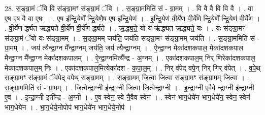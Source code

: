 \documentclass[17pt]{extarticle}
\begin{document}
28. स॒ङ्ग्रा॒मं ॅवि वि स॑ङ्ग्रा॒मꣳ स॑ङ्ग्रा॒मं ॅवि । . स॒ङ्ग्रा॒ममिति॑ सं - ग्रा॒मम् । . वि वै वै वि वि वै । . वा ए॒ष ए॒ष वै वा ए॒षः । . ए॒ष इ॑न्द्रि॒येणे᳚ न्द्रि॒येणै॒ष ए॒ष इ॑न्द्रि॒येण॑ । . इ॒न्द्रि॒येण॑ वी॒र्ये॑ण वी॒र्ये॑णे न्द्रि॒येणे᳚ न्द्रि॒येण॑ वी॒र्ये॑ण । . वी॒र्ये॑ण र्द्ध्यत ऋद्ध्यते वी॒र्ये॑ण वी॒र्ये॑ण र्द्ध्यते । . ऋ॒द्ध्य॒ते॒ यो य ऋ॑द्ध्यत ऋद्ध्यते॒ यः । . यः स॑ङ्ग्रा॒मꣳ स॑ङ्ग्रा॒मं ॅयो यः स॑ङ्ग्रा॒मम् । . स॒ङ्ग्रा॒मम् जय॑ति॒ जय॑ति सङ्ग्रा॒मꣳ स॑ङ्ग्रा॒मम् जय॑ति । . स॒ङ्ग्रा॒ममिति॑ सं - ग्रा॒मम् । . जय॑ त्यैन्द्रा॒ग्न मै᳚न्द्रा॒ग्नम् जय॑ति॒ जय॑ त्यैन्द्रा॒ग्नम् । . ऐ॒न्द्रा॒ग्न मेका॑दशकपाल॒ मेका॑दशकपाल मैन्द्रा॒ग्न मै᳚न्द्रा॒ग्न मेका॑दशकपालम् । . ऐ॒न्द्रा॒ग्नमित्यै᳚न्द्र - अ॒ग्नम् । . एका॑दशकपाल॒म् निर् णिरेका॑दशकपाल॒ मेका॑दशकपाल॒म् निः । . एका॑दशकपाल॒मित्येका॑दश - क॒पा॒ल॒म् । . निर् व॑पेद् वपे॒न् निर् णिर् व॑पेत् । . व॒पे॒थ् स॒ङ्ग्रा॒मꣳ स॑ङ्ग्रा॒मं ॅव॑पेद् वपेथ् सङ्ग्रा॒मम् । . स॒ङ्ग्रा॒मम् जि॒त्वा जि॒त्वा स॑ङ्ग्रा॒मꣳ स॑ङ्ग्रा॒मम् जि॒त्वा । . स॒ङ्ग्रा॒ममिति॑ सं - ग्रा॒मम् । . जि॒त्वेन्द्रा॒ग्नी इ॑न्द्रा॒ग्नी जि॒त्वा जि॒त्वेन्द्रा॒ग्नी । . इ॒न्द्रा॒ग्नी ए॒वैवे न्द्रा॒ग्नी इ॑न्द्रा॒ग्नी ए॒व । . इ॒न्द्रा॒ग्नी इती᳚न्द्र - अ॒ग्नी । . ए॒व स्वेन॒ स्वे नै॒वैव स्वेन॑ । . स्वेन॑ भाग॒धेये॑न भाग॒धेये॑न॒ स्वेन॒ स्वेन॑ भाग॒धेये॑न । . भा॒ग॒धेये॒नोपोप॑ भाग॒धेये॑न भाग॒धेये॒नोप॑ । \newline
\end{document}
